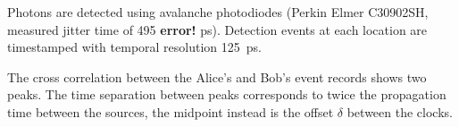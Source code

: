 \documentclass[aps,pra,onecolumn, superscriptaddress]{revtex4}
\begin{document}
Photons are detected using avalanche photodiodes (Perkin Elmer C30902SH, measured jitter time of 495 \textbf{error!} ps).
Detection events at each location are timestamped with temporal resolution 125~ps.


The cross correlation between the Alice's and Bob's event records shows two peaks.   The time separation between peaks corresponds to twice the propagation time between the sources, the midpoint instead is the offset $\delta$ between the clocks.



\end{document}
